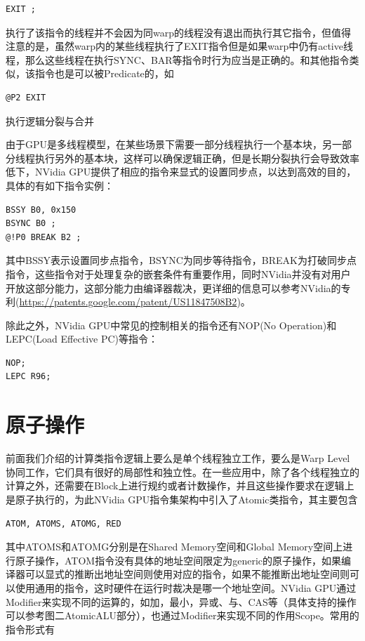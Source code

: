 \begin{lstlisting}
EXIT ;
\end{lstlisting}

执行了该指令的线程并不会因为同warp的线程没有退出而执行其它指令，但值得注意的是，虽然warp内的某些线程执行了EXIT指令但是如果warp中仍有active线程，那么这些线程在执行SYNC、BAR等指令时行为应当是正确的。和其他指令类似，该指令也是可以被Predicate的，如

\begin{lstlisting}
@P2 EXIT
\end{lstlisting}

执行逻辑分裂与合并

由于GPU是多线程模型，在某些场景下需要一部分线程执行一个基本块，另一部分线程执行另外的基本块，这样可以确保逻辑正确，但是长期分裂执行会导致效率低下，NVidia GPU提供了相应的指令来显式的设置同步点，以达到高效的目的，具体的有如下指令实例：

\begin{lstlisting}
BSSY B0, 0x150
BSYNC B0 ;
@!P0 BREAK B2 ;
\end{lstlisting}

其中BSSY表示设置同步点指令，BSYNC为同步等待指令，BREAK为打破同步点指令，这些指令对于处理复杂的嵌套条件有重要作用，同时NVidia并没有对用户开放这部分能力，这部分能力由编译器裁决，更详细的信息可以参考NVidia的专利(\url{https://patents.google.com/patent/US11847508B2})。

除此之外，NVidia GPU中常见的控制相关的指令还有NOP(No Operation)和LEPC(Load Effective PC)等指令：

\begin{lstlisting}
NOP;
LEPC R96;
\end{lstlisting}

\section{原子操作}

前面我们介绍的计算类指令逻辑上要么是单个线程独立工作，要么是Warp Level协同工作，它们具有很好的局部性和独立性。在一些应用中，除了各个线程独立的计算之外，还需要在Block上进行规约或者计数操作，并且这些操作要求在逻辑上是原子执行的，为此NVidia GPU指令集架构中引入了Atomic类指令，其主要包含

\begin{lstlisting}
ATOM, ATOMS, ATOMG, RED
\end{lstlisting}

其中ATOMS和ATOMG分别是在Shared Memory空间和Global Memory空间上进行原子操作，ATOM指令没有具体的地址空间限定为generic的原子操作，如果编译器可以显式的推断出地址空间则使用对应的指令，如果不能推断出地址空间则可以使用通用的指令，这时硬件在运行时裁决是哪一个地址空间。NVidia GPU通过Modifier来实现不同的运算的，如加，最小，异或、与、CAS等（具体支持的操作可以参考图二AtomicALU部分），也通过Modifier来实现不同的作用Scope。常用的指令形式有

